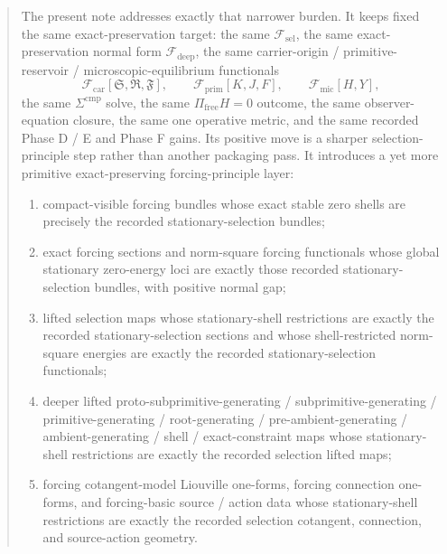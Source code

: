\documentclass[11pt]{article}
\newcommand{\GaugeAux}{Y}
\newcommand{\MicFunctional}{\mathscr F_{\mathrm{mic}}}
\newcommand{\PrimFunctional}{\mathscr F_{\mathrm{prim}}}
\newcommand{\CarrierFunctional}{\mathscr F_{\mathrm{car}}}
\newcommand{\DeepFunctional}{\mathscr F_{\mathrm{deep}}}
\newcommand{\StemFunctional}{\mathscr F_{\mathrm{sel}}}
\newcommand{\PrimStrain}{K}
\newcommand{\PrimNeutral}{J}
\newcommand{\PrimFree}{F}
\newcommand{\CarrierSeed}{\mathfrak S}
\newcommand{\RelabelSeed}{\mathfrak R}
\newcommand{\FreeSeed}{\mathfrak F}
\begin{document}
\begin{abstract}
The present note addresses exactly that narrower burden. It keeps fixed the same exact-preservation target: the same \(\StemFunctional\), the same exact-preservation normal form \(\DeepFunctional\), the same carrier-origin / primitive-reservoir / microscopic-equilibrium functionals
\[
\CarrierFunctional[\CarrierSeed,\RelabelSeed,\FreeSeed],\qquad
\PrimFunctional[\PrimStrain,\PrimNeutral,\PrimFree],\qquad
\MicFunctional[H,\GaugeAux],
\]
the same \(\Sigma^{\mathrm{cmp}}\) solve, the same \(\Pi_{\mathrm{free}}H=0\) outcome, the same observer-equation closure, the same one operative metric, and the same recorded Phase D / E and Phase F gains. Its positive move is a sharper selection-principle step rather than another packaging pass. It introduces a yet more primitive exact-preserving forcing-principle layer:
\begin{enumerate}
    \item compact-visible forcing bundles whose exact stable zero shells are precisely the recorded stationary-selection bundles;
    \item exact forcing sections and norm-square forcing functionals whose global stationary zero-energy loci are exactly those recorded stationary-selection bundles, with positive normal gap;
    \item lifted selection maps whose stationary-shell restrictions are exactly the recorded stationary-selection sections and whose shell-restricted norm-square energies are exactly the recorded stationary-selection functionals;
    \item deeper lifted proto-subprimitive-generating / subprimitive-generating / primitive-generating / root-generating / pre-ambient-generating / ambient-generating / shell / exact-constraint maps whose stationary-shell restrictions are exactly the recorded selection lifted maps;
    \item forcing cotangent-model Liouville one-forms, forcing connection one-forms, and forcing-basic source / action data whose stationary-shell restrictions are exactly the recorded selection cotangent, connection, and source-action geometry.
\end{enumerate}


\end{abstract}
\end{document}
